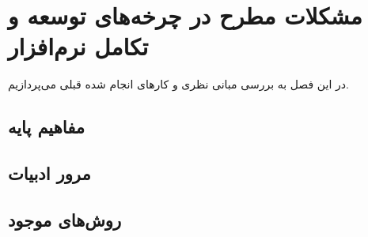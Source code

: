 \chapter{مشکلات مطرح در چرخه‌های توسعه و تکامل نرم‌افزار}
\label{ch:theory}

در این فصل به بررسی مبانی نظری و کارهای انجام شده قبلی می‌پردازیم.

\section{مفاهیم پایه}
\label{sec:ch2-concepts}


\section{مرور ادبیات}
\label{sec:ch2-literature}


\section{روش‌های موجود}
\label{sec:ch2-methods}


